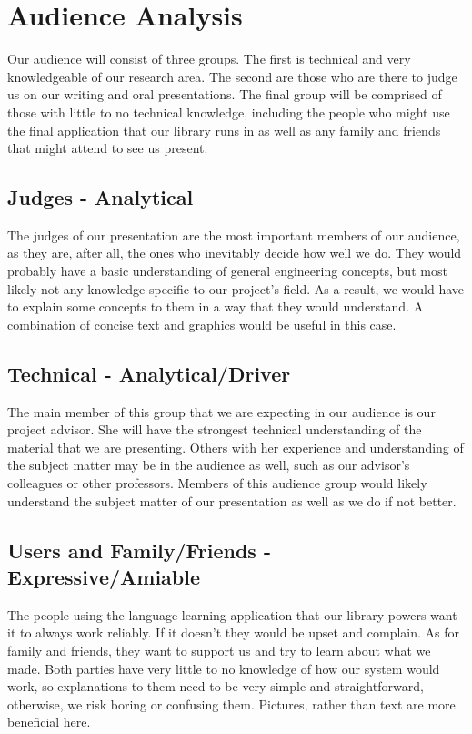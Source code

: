 \chapter{Audience Analysis}

Our audience will consist of three groups. The first is technical and very knowledgeable of our research area. The second are those who are there to judge us on our writing and oral presentations. The final group will be comprised of those with little to no technical knowledge, including the people who might use the final application that our library runs in as well as any family and friends that might attend to see us present.

\section{Judges - Analytical}
The judges of our presentation are the most important members of our audience, as they are, after all, the ones who inevitably decide how well we do. They would probably have a basic understanding of general engineering concepts, but most likely not any knowledge specific to our project's field. As a result, we would have to explain some concepts to them in a way that they would understand. A combination of concise text and graphics would be useful in this case.


\section{Technical - Analytical/Driver}
The main member of this group that we are expecting in our audience is our project advisor. She will have the strongest technical understanding of the material that we are presenting. Others with her experience and understanding of the subject matter may be in the audience as well, such as our advisor's colleagues or other professors. Members of this audience group would likely understand the subject matter of our presentation as well as we do if not better.


\section{Users and Family/Friends - Expressive/Amiable}
The people using the language learning application that our library powers want it to always work reliably. If it doesn't they would be upset and complain. As for family and friends, they want to support us and try to learn about what we made. Both parties have very little to no knowledge of how our system would work, so explanations to them need to be very simple and straightforward, otherwise, we risk boring or confusing them. Pictures, rather than text are more beneficial here.


